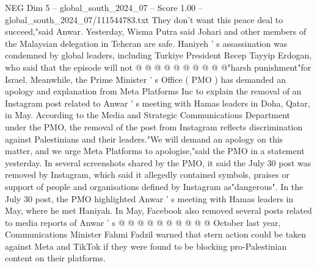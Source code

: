 \begin{textsample}{NEG Dim 5 – global\_south\_2024\_07 – Score 1.00 – global\_south\_2024\_07/111544783.txt}
They don't want this peace deal to succeed,"said Anwar.
Yesterday, Wisma Putra said Johari and other members of the Malaysian delegation in Teheran are safe.
Haniyeh ' s assassination was condemned by global leaders, including Turkiye President Recep Tayyip Erdogan, who said that the episode will not @ @ @ @ @ @ @ @ @ @"harsh punishment"for Israel.
Meanwhile, the Prime Minister ' s Office ( PMO ) has demanded an apology and explanation from Meta Platforms Inc to explain the removal of an Instagram post related to Anwar ' s meeting with Hamas leaders in Doha, Qatar, in May.
According to the Media and Strategic Communications Department under the PMO, the removal of the post from Instagram reflects discrimination against Palestinians and their leaders."We will demand an apology on this matter, and we urge Meta Platforms to apologise,"said the PMO in a statement yesterday.
In several screenshots shared by the PMO, it said the July 30 post was removed by Instagram, which said it allegedly contained symbols, praises or support of people and organisations defined by Instagram as"dangerous".
In the July 30 post, the PMO highlighted Anwar ' s meeting with Hamas leaders in May, where he met Haniyah.
In May, Facebook also removed several posts related to media reports of Anwar ' s @ @ @ @ @ @ @ @ @ @ October last year, Communications Minister Fahmi Fadzil warned that stern action could be taken against Meta and TikTok if they were found to be blocking pro-Palestinian content on their platforms.

\end{textsample}
